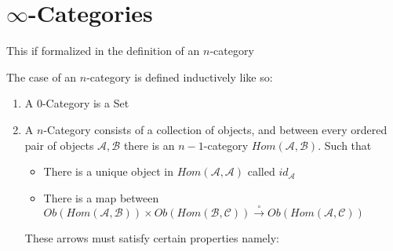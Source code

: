\chapter{$\infty$-Categories}
This if formalized in the definition of an $n$-category
\begin{definition}
    The case of an $n$-category is defined inductively like so:
    \begin{enumerate}
        \item A 0-Category is a Set
        \item A $n$-Category consists of a collection of objects, and between every ordered pair of objects $\mathcal{A},\mathcal{B}$ there is an $n-1$-category $Hom(\mathcal{A},\mathcal{B})$. Such that
        \begin{itemize}
            \item There is a unique object in $Hom(\mathcal{A},\mathcal{A})$ called $id_\mathcal{A}$
            \item There is a map between $Ob(Hom(\mathcal{A},\mathcal{B})) \times Ob(Hom(\mathcal{B},\mathcal{C})) \xrightarrow{\circ} Ob(Hom(\mathcal{A},\mathcal{C}))$
        \end{itemize}
        These arrows must satisfy certain properties namely:
\begin{comment}
            \begin{enumerate}
            \item For any object $f \in Ob(Hom(\mathcal{A},\mathcal{B}))$  then under our composition map $\circ$ then $b_{id} \circ f = f = f \circ id_a$. Thinking of the objects of $Hom(\mathcal{A},\mathcal{B}$ as arrows from $\mathcal{A}$ to $\mathcal{B}$ we have:
            \[\begin{tikzcd}
                \mathcal{A} & \mathcal{A} & \mathcal{B} & \mathcal{B}
                \arrow["{id_\mathcal{A}}", from=1-1, to=1-2]
                \arrow["f", from=1-2, to=1-3]
                \arrow["{id_\mathcal{B}", from=1-3, to=1-4]
                \arrow["f"', curve={height=12pt}, from=1-1, to=1-3]
                \arrow["f"', curve={height=12pt}, from=1-2, to=1-4]
            \end{tikzcd}\]
            \item For any $f \in Ob(Hom(\mathcal{A},\mathcal{B}))$, $g \in Ob(Hom(\mathcal{B},\mathcal{C}))$ and $h \in Ob(Hom(\mathcal{C},\mathcal{D})$, then $h \circ(g \circ f)=(h \circ g) \circ f$ 

\end{comment}
\end{enumerate}
\end{definition}

